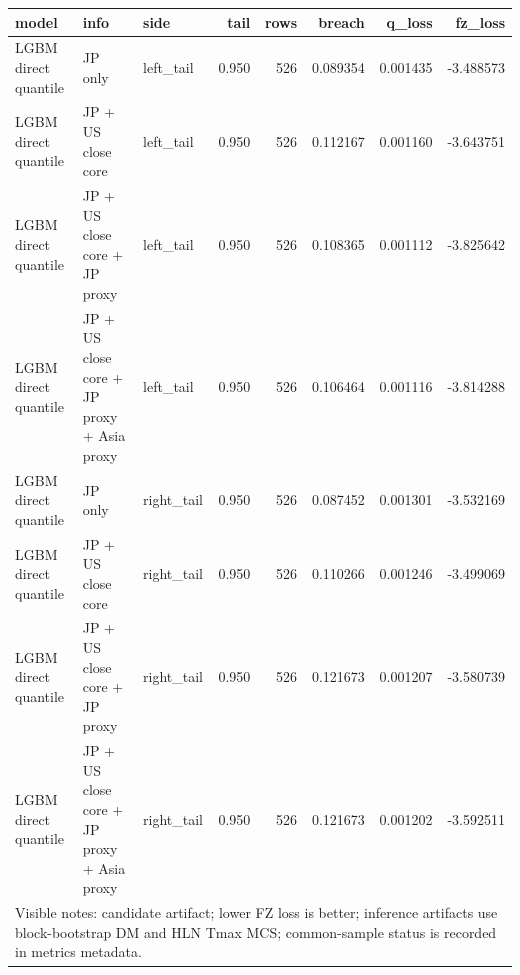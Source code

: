\begin{tabular}{lllrrrrr}
\toprule
model & info & side & tail & rows & breach & q_loss & fz_loss \\
\midrule
LGBM direct quantile & JP only & left\_tail & 0.950 & 526 & 0.089354 & 0.001435 & -3.488573 \\
LGBM direct quantile & JP + US close core & left\_tail & 0.950 & 526 & 0.112167 & 0.001160 & -3.643751 \\
LGBM direct quantile & JP + US close core + JP proxy & left\_tail & 0.950 & 526 & 0.108365 & 0.001112 & -3.825642 \\
LGBM direct quantile & JP + US close core + JP proxy + Asia proxy & left\_tail & 0.950 & 526 & 0.106464 & 0.001116 & -3.814288 \\
LGBM direct quantile & JP only & right\_tail & 0.950 & 526 & 0.087452 & 0.001301 & -3.532169 \\
LGBM direct quantile & JP + US close core & right\_tail & 0.950 & 526 & 0.110266 & 0.001246 & -3.499069 \\
LGBM direct quantile & JP + US close core + JP proxy & right\_tail & 0.950 & 526 & 0.121673 & 0.001207 & -3.580739 \\
LGBM direct quantile & JP + US close core + JP proxy + Asia proxy & right\_tail & 0.950 & 526 & 0.121673 & 0.001202 & -3.592511 \\
\midrule
\multicolumn{8}{l}{\footnotesize Visible notes: candidate artifact; lower FZ loss is better; inference artifacts use block-bootstrap DM and HLN Tmax MCS; common-sample status is recorded in metrics metadata.} \\
\bottomrule
\end{tabular}
